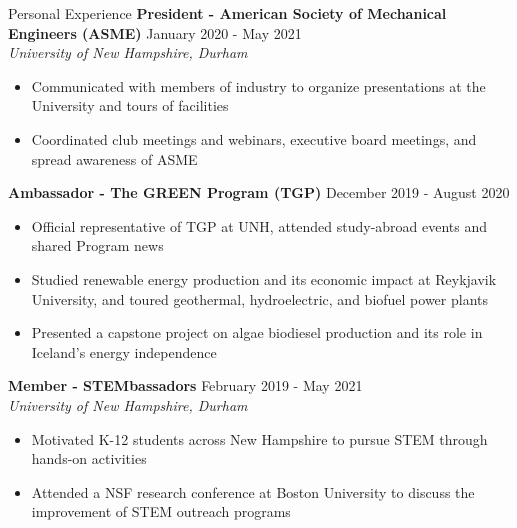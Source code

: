\documentclass{resume}
\begin{document}
\begin{rSection}{Personal Experience}
    {\bf President - American Society of Mechanical Engineers (ASME)} \hfill {January 2020 - May 2021}
    \\ {\em University of New Hampshire, Durham}
    \vspace{-0.5em}
    \begin{itemize}[label={\tiny\raisebox{1ex}{\textbullet}}, noitemsep]
        \item Communicated with members of industry to organize presentations at the University and tours of facilities
        \item Coordinated club meetings and webinars, executive board meetings, and spread awareness of ASME
    \end{itemize}
    \vspace{-0.4em}
    {\bf Ambassador - The GREEN Program (TGP)} \hfill {December 2019 - August 2020}
    \vspace{-0.5em}
    \begin{itemize}[label={\tiny\raisebox{1ex}{\textbullet}}, noitemsep]
        \item Official representative of TGP at UNH, attended study-abroad events and shared Program news
        \item Studied renewable energy production and its economic impact at Reykjavik University, and toured geothermal, hydroelectric, and biofuel power plants
        \item Presented a capstone project on algae biodiesel production and its role in Iceland's energy independence
    \end{itemize}
    \vspace{-0.4em}
    {\bf Member - STEMbassadors} \hfill {{February 2019 - May 2021}}
    \\ {\em University of New Hampshire, Durham}
    \vspace{-0.5em}
    \begin{itemize}[label={\tiny\raisebox{1ex}{\textbullet}}, noitemsep]
        \item Motivated K-12 students across New Hampshire to pursue STEM through hands-on activities
        \item Attended a NSF research conference at Boston University to discuss the improvement of STEM outreach programs
    \end{itemize}
    \vspace{-0.4em}
\end{rSection}
\end{document}
